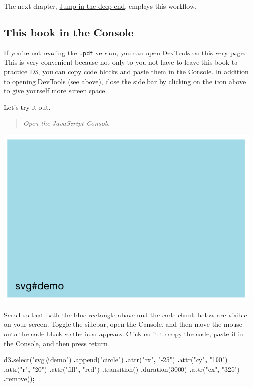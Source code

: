 \documentclass[
  openany]{book}
\newenvironment{Shaded}{\begin{snugshade}}{\end{snugshade}}
\newcommand{\DecValTok}[1]{\textcolor[rgb]{0.00,0.00,0.81}{#1}}
\newcommand{\FunctionTok}[1]{\textcolor[rgb]{0.00,0.00,0.00}{#1}}
\newcommand{\NormalTok}[1]{#1}
\newcommand{\OperatorTok}[1]{\textcolor[rgb]{0.81,0.36,0.00}{\textbf{#1}}}
\newcommand{\StringTok}[1]{\textcolor[rgb]{0.31,0.60,0.02}{#1}}
\begin{document}
The next chapter, \href{jump.html}{Jump in the deep end}, employs this workflow.

\hypertarget{this-book-in-the-console}{%
\subsection{This book in the Console}\label{this-book-in-the-console}}

If you're not reading the \texttt{.pdf} version, you can open DevTools on this very page. This is very convenient because not only to you not have to leave this book to practice D3, you can copy code blocks and paste them in the Console. In addition to opening DevTools (see above), close the side bar by clicking on the icon above to give yourself more screen space.

Let's try it out.

\begin{quote}
\emph{Open the JavaScript Console}
\end{quote}

\includegraphics[width=0.33\linewidth]{images/pdfbook/svg1}

Scroll so that both the blue rectangle above and the code chunk below are visible on your screen. Toggle the sidebar, open the Console, and then move the mouse onto the code block so the icon appears. Click on it to copy the code, paste it in the Console, and then press return.

\begin{Shaded}
\begin{Highlighting}[]
\NormalTok{d3}\OperatorTok{.}\FunctionTok{select}\NormalTok{(}\StringTok{"svg\#demo"}\NormalTok{)}
  \OperatorTok{.}\FunctionTok{append}\NormalTok{(}\StringTok{"circle"}\NormalTok{)}
    \OperatorTok{.}\FunctionTok{attr}\NormalTok{(}\StringTok{"cx"}\OperatorTok{,} \StringTok{"{-}25"}\NormalTok{)              }
    \OperatorTok{.}\FunctionTok{attr}\NormalTok{(}\StringTok{"cy"}\OperatorTok{,} \StringTok{"100"}\NormalTok{)}
    \OperatorTok{.}\FunctionTok{attr}\NormalTok{(}\StringTok{"r"}\OperatorTok{,} \StringTok{"20"}\NormalTok{)}
    \OperatorTok{.}\FunctionTok{attr}\NormalTok{(}\StringTok{"fill"}\OperatorTok{,} \StringTok{"red"}\NormalTok{)}
  \OperatorTok{.}\FunctionTok{transition}\NormalTok{()}
  \OperatorTok{.}\FunctionTok{duration}\NormalTok{(}\DecValTok{3000}\NormalTok{)}
    \OperatorTok{.}\FunctionTok{attr}\NormalTok{(}\StringTok{"cx"}\OperatorTok{,} \StringTok{"325"}\NormalTok{)}
  \OperatorTok{.}\FunctionTok{remove}\NormalTok{()}\OperatorTok{;}
\end{Highlighting}
\end{Shaded}
\end{document}
